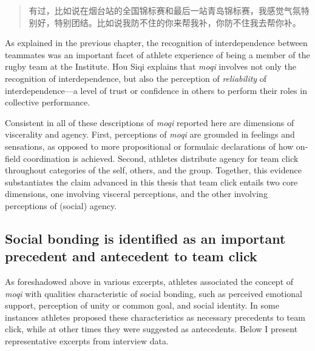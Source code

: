 \begin{CJK}{UTF8}{gbsn}
  \begin{quote}
    有过，比如说在烟台站的全国锦标赛和最后一站青岛锦标赛，我感觉气氛特别好，特别团结。比如说我防不住的你来帮我补，你防不住我去帮你补。
  \end{quote}

As explained in the previous chapter, the recognition of interdependence between teammates was an important facet of athlete experience of being a member of the rugby team at the Institute.  Hou Siqi explains that \textit{moqi} involves not only the recognition of interdependence, but also the perception of \textit{reliability} of interdependence---a level of trust or confidence in others to perform their roles in collective performance.


Consistent in all of these descriptions of \textit{moqi} reported here are dimensions of viscerality and agency.  First, perceptions of \textit{moqi} are grounded in feelings and sensations, as opposed to more propositional or formulaic declarations of how on-field coordination is achieved.  Second, athletes distribute agency for team click throughout categories of the self, others, and the group.  Together, this evidence substantiates the claim advanced in this thesis that team click entails two core dimensions, one involving visceral perceptions, and the other involving perceptions of (social) agency.





\subsection{Social bonding is identified as an important precedent and antecedent to team click\label{sect:clickBondingAutomatic}}
As foreshadowed above in various excerpts, athletes associated the concept of \textit{moqi} with qualities characteristic of social bonding, such as perceived emotional support, perception of unity or common goal, and social identity.  In some instances athletes proposed these characteristics as necessary precedents to team click, while at other times they were suggested as antecedents.  Below I present representative excerpts from interview data.


\end{CJK}
